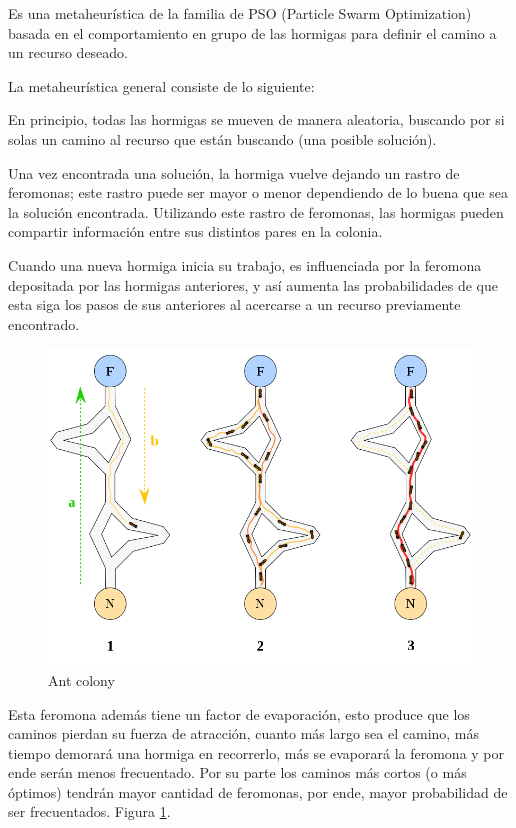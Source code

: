 \documentclass[a4paper,spanish]{article}
\begin{document}
Es una metaheurística de la familia de PSO (Particle Swarm Optimization) basada en el
comportamiento en grupo de las hormigas para definir el camino a un recurso deseado.

La metaheurística general consiste de lo siguiente:

En principio, todas las hormigas se mueven de manera aleatoria, buscando por si solas
un camino al recurso que están buscando (una posible solución).

Una vez encontrada una solución, la hormiga vuelve dejando un rastro de feromonas; 
este rastro puede ser mayor o menor dependiendo de lo buena que sea la solución encontrada.
Utilizando este rastro de feromonas, las hormigas pueden compartir información entre sus
distintos pares en la colonia. 

Cuando una nueva hormiga inicia su trabajo, es influenciada por la feromona depositada por
las hormigas anteriores, y así aumenta las probabilidades de que esta siga los pasos de sus
anteriores al acercarse a un recurso previamente encontrado.

\begin{figure}[h]
	\centering
	\includegraphics[scale=0.2]{./img/antscolonyalg.png}
	\caption{Ant colony}
	\label{img:ants}
\end{figure}

Esta feromona además tiene un factor de evaporación, esto produce que los caminos pierdan
su fuerza de atracción, cuanto más largo sea el camino, más tiempo demorará una hormiga
en recorrerlo, más se evaporará la feromona y por ende serán menos frecuentado. Por su parte
los caminos más cortos (o más óptimos) tendrán mayor cantidad de feromonas, por ende, mayor
probabilidad de ser frecuentados. Figura \ref{img:ants}.
\end{document}
